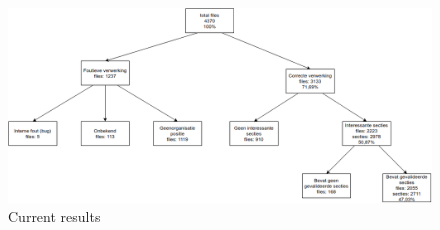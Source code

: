\documentclass{ou-report}
\begin{document}
\begin{figure}[H]
    \centering
    \includegraphics[width=17cm]{images/lncs_front_matter_result.drawio.png}
    \caption{Current results}
    \label{fig:lncs_pdf_database}
\end{figure}


\end{document}

